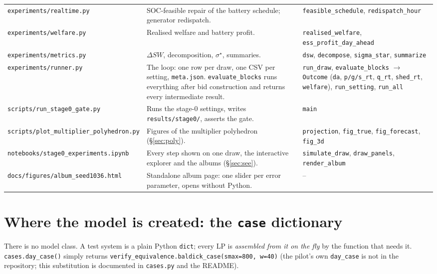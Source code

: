 \documentclass[10pt,a4paper]{article}
\newcommand{\code}[1]{\texttt{#1}}
\begin{document}
\begin{center}
\begin{tabularx}{\textwidth}{@{}l>{\raggedright\arraybackslash}X>{\raggedright\arraybackslash}p{4.3cm}@{}}
\code{experiments/realtime.py} & SOC-feasible repair of the battery schedule; generator redispatch. & \code{feasible\_schedule}, \code{redispatch\_hour} \\
\code{experiments/welfare.py} & Realised welfare and battery profit. & \code{realised\_welfare}, \code{ess\_profit\_day\_ahead} \\
\code{experiments/metrics.py} & $\Delta SW$, decomposition, $\sigma^\star$, summaries. & \code{dsw}, \code{decompose}, \code{sigma\_star}, \code{summarize} \\
\code{experiments/runner.py} & The loop: one row per draw, one CSV per setting, \code{meta.json}. \code{evaluate\_blocks} runs everything after bid construction and returns every intermediate result. & \code{run\_draw}, \code{evaluate\_blocks} $\to$ \code{Outcome} (\code{da}, \code{p/g/s\_rt}, \code{q\_rt}, \code{shed\_rt}, \code{welfare}), \code{run\_setting}, \code{run\_all} \\
\midrule
\code{scripts/run\_stage0\_gate.py} & Runs the stage-0 settings, writes \code{results/stage0/}, asserts the gate. & \code{main} \\
\code{scripts/plot\_multiplier\_polyhedron.py} & Figures of the multiplier polyhedron (\S\ref{sec:poly}). & \code{projection}, \code{fig\_true}, \code{fig\_forecast}, \code{fig\_3d} \\
\code{notebooks/stage0\_experiments.ipynb} & Every step shown on one draw, the interactive explorer and the albums (\S\ref{sec:see}). & \code{simulate\_draw}, \code{draw\_panels}, \code{render\_album} \\
\code{docs/figures/album\_seed1036.html} & Standalone album page: one slider per error parameter, opens without Python. & -- \\
\bottomrule
\end{tabularx}
\end{center}

\section{Where the model is created: the \code{case} dictionary}

There is no model class. A test system is a plain Python \code{dict}; every LP is \emph{assembled from it on
the fly} by the function that needs it. \code{cases.day\_case()} simply returns
\code{verify\_equivalence.baldick\_case(smax=800, w=40)} (the pilot's own \code{day\_case} is not in the
repository; this substitution is documented in \code{cases.py} and the README).
\end{document}
